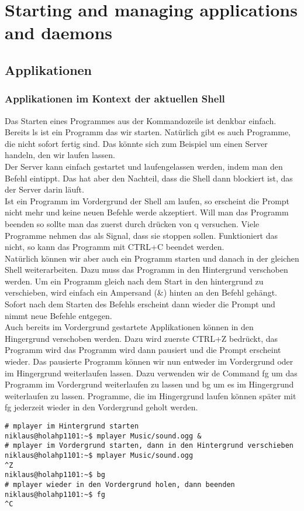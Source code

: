 \section{Starting and managing applications and daemons}
\subsection{Applikationen}
\subsubsection{Applikationen im Kontext der aktuellen Shell}
Das Starten eines Programmes aus der Kommandozeile ist denkbar einfach. Bereits ls ist ein Programm das wir starten. Nat\"urlich gibt es auch Programme, die nicht sofort fertig sind. Das k\"onnte sich zum Beispiel um einen Server handeln, den wir laufen lassen.\\
Der Server kann einfach gestartet und laufengelassen werden, indem man den Befehl eintippt. Das hat aber den Nachteil, dass die Shell dann blockiert ist, das der Server darin l\"auft.\\
Ist ein Programm im Vordergrund der Shell am laufen, so erscheint die Prompt nicht mehr und keine neuen Befehle werde akzeptiert. Will man das Programm beenden so sollte man das zuerst durch dr\"ucken von q versuchen. Viele Programme nehmen das als Signal, dass sie stoppen sollen. Funktioniert das nicht, so kann das Programm mit CTRL+C beendet werden.\\
Nat\"urlich k\"onnen wir aber auch ein Programm starten und danach in der gleichen Shell weiterarbeiten. Dazu muss das Programm in den Hintergrund verschoben werden. Um ein Programm gleich nach dem Start in den hintergrund zu verschieben, wird einfach ein Ampersand (\&) hinten an den Befehl geh\"angt. Sofort nach dem Starten des Befehls erscheint dann wieder die Prompt und nimmt neue Befehle entgegen.\\
Auch bereits im Vordergrund gestartete Applikationen k\"onnen in den Hingergrund verschoben werden. Dazu wird zuerste CTRL+Z bedr\"uckt, das Programm wird das Programm wird dann pausiert und die Prompt erscheint wieder. Das pausierte Programm k\"onnen wir nun entweder im Vordergrund oder im Hingergrund weiterlaufen lassen. Dazu verwenden wir de Command fg um das Programm im Vordergrund weiterlaufen zu lassen und bg um es im Hingergrund weiterlaufen zu lassen. Programme, die im Hingergrund laufen k\"onnen sp\"ater mit fg jederzeit wieder in den Vordergrund geholt werden.
\begin{lstlisting}[frame=single]
# mplayer im Hintergrund starten
niklaus@holahp1101:~$ mplayer Music/sound.ogg &
# mplayer im Vordergrund starten, dann in den Hintergrund verschieben
niklaus@holahp1101:~$ mplayer Music/sound.ogg
^Z
niklaus@holahp1101:~$ bg
# mplayer wieder in den Vordergrund holen, dann beenden
niklaus@holahp1101:~$ fg
^C
\end{lstlisting}
